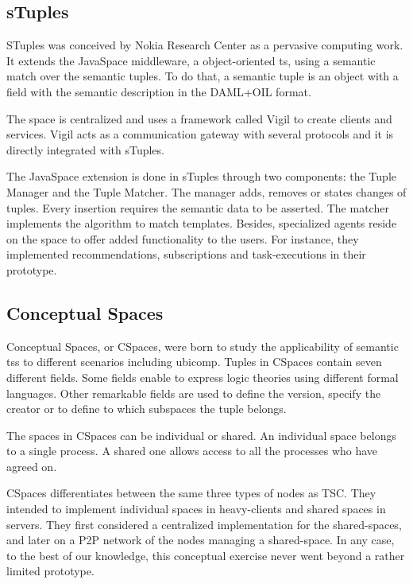 \subsection{sTuples}

STuples \citep{khushraj_stuples:_2004} was conceived by Nokia Research Center as a pervasive computing work.
It extends the JavaSpace middleware, a object-oriented \acl{ts}, using a semantic match over the semantic tuples.
To do that, a semantic tuple is an object with a field with the semantic description in the DAML+OIL format. %


The space is centralized and uses a framework called Vigil to create clients and services. %
Vigil acts as a communication gateway with several protocols and it is directly integrated with sTuples.


The JavaSpace extension is done in sTuples through two components: the Tuple Manager and the Tuple Matcher.
The manager adds, removes or states changes of tuples.
Every insertion requires the semantic data to be asserted.
The matcher implements the algorithm to match templates.
Besides, specialized agents reside on the space to offer added functionality to the users.
For instance, they implemented recommendations, subscriptions and task-executions in their prototype.



\subsection{Conceptual Spaces}

Conceptual Spaces, or CSpaces, were born to study the applicability of semantic \aclp{ts} to different scenarios including \acl{ubicomp}.
Tuples in CSpaces contain seven different fields.
Some fields enable to express logic theories using different formal languages.
Other remarkable fields are used to define the version, specify the creator or to define to which subspaces the tuple belongs. %

The spaces in CSpaces can be individual or shared.
An individual space belongs to a single process.
A shared one allows access to all the processes who have agreed on.

CSpaces differentiates between the same three types of nodes as TSC.
They intended to implement individual spaces in heavy-clients and shared spaces in servers.
They first considered a centralized implementation for the shared-spaces, %
and later on a P2P network of the nodes managing a shared-space. %
In any case, to the best of our knowledge, this conceptual exercise never went beyond a rather limited prototype.



